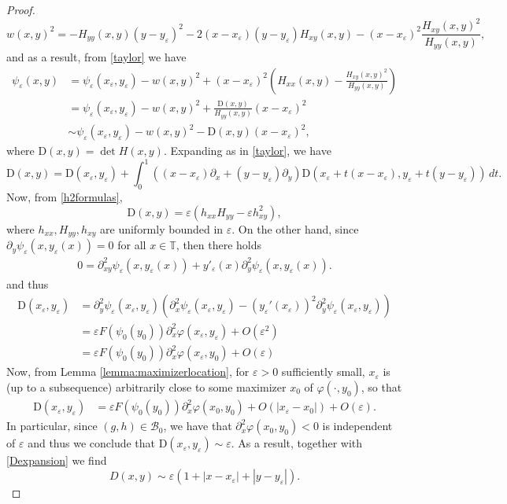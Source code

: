 \documentclass[11pt,reqno]{amsproc}
\newcommand{\pa}{\partial}
\newcommand{\ve}{\varepsilon}
\numberwithin{equation}{section}
\numberwithin{theorem}{section}
\numberwithin{prop}{section}
\numberwithin{cor}{section}
\numberwithin{lemma}{section}
\theoremstyle{remark}
\theoremstyle{definition}
\begin{document}
\begin{proof}
\begin{equation}
 w(x,y)^2 = -H_{yy}(x,y) (y-y_\ve)^2 - 2(x-x_\ve)(y-y_\ve) H_{xy}(x,y) - (x-x_\ve)^2 \frac{H_{xy}(x,y)^2}{H_{yy}(x,y)},
 \label{}
\end{equation}
and as a result, from \eqref{taylor} we have
\begin{align*}
\psi_\ve(x,y) &= \psi_\ve(x_\ve,y_\ve) - w(x,y)^2
 + (x-x_\ve)^2 \left( H_{xx}(x,y) - \frac{H_{xy}(x,y)^2}{H_{yy}(x,y)}\right)
 \\
 &= \psi_\ve(x_\ve,y_\ve) - w(x,y)^2 + \frac{ \mathrm{D}(x,y)}{H_{yy}(x,y)} (x-x_\ve)^2 \\
&\sim \psi_\ve(x_\ve,y_\ve) - w(x,y)^2 -  \mathrm{D}(x,y) (x-x_\ve)^2,
\end{align*}
where $\mathrm{D}(x,y) = \det H(x,y)$. Expanding as in \eqref{taylor}, we have
\begin{equation}
\mathrm{D}(x,y)= \mathrm{D}(x_\ve,y_\ve) +
 \int_{0}^1 ((x-x_\ve)\pa_x + (y-y_\ve) \pa_y) \mathrm{D}(x_\ve +t(x-x_\ve), y_\ve + t(y-y_\ve))\, dt.
 \label{Dexpansion}
\end{equation}
Now, from \eqref{h2formulas},
\begin{equation}
 \mathrm{D}(x,y) = \ve (h_{xx}H_{yy} - \ve h_{xy}^2),
\end{equation}
where $h_{xx}, H_{yy}, h_{xy}$ are uniformly bounded in $\ve$. On the other hand, since $\partial_y\psi_\ve(x,y_\ve(x))=0$ for all $x\in \mathbb{T}$, then there holds
\begin{align*}
0 = \partial_{xy}^2\psi_\ve(x,y_\ve(x)) + y'_\ve(x)\partial_y^2\psi_\ve(x,y_\ve(x)).
\end{align*}
and thus
\begin{align*}
\mathrm{D}(x_\ve,y_\ve) &= \partial_y^2\psi_\ve(x_\ve,y_\ve)\left( \partial_x^2 \psi_\ve(x_\ve,y_\ve) - (y_\ve'(x_\ve))^2\partial_y^2 \psi_\ve(x_\ve,y_\ve) \right) \\
&= \ve F(\psi_0(y_0))\partial_x^2\varphi(x_\ve,y_\ve) + O(\ve^2) \\
&= \ve F(\psi_0(y_0))\partial_x^2\varphi(x_\ve,y_0) + O(\ve)
\end{align*} 
Now, from Lemma \ref{lemma:maximizerlocation}, for $\ve>0$ sufficiently small, $x_\ve$ is (up to a subsequence) arbitrarily close to some maximizer $x_0$ of $\varphi(\cdot, y_0)$, so that
\begin{align*}
\mathrm{D}(x_\ve,y_\ve) &=\ve F(\psi_0(y_0))\partial_x^2\varphi(x_0,y_0) + O(|x_\ve-x_0|) + O(\ve).
\end{align*}
In particular, since $(g,h)\in \mathcal{B}_0$, we have that $\partial_x^2\varphi(x_0,y_0) < 0$ is independent of $\ve$ and thus we conclude that $\mathrm{D}(x_\ve,y_\ve) \sim \ve$. As a result, together with \eqref{Dexpansion} we find
\begin{equation}
 D(x,y) \sim \ve (1+ |x-x_\ve| + |y-y_\ve|).
 \label{}
\end{equation}


\end{proof}
\end{document}
